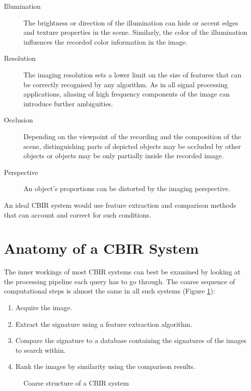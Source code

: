 \begin{description}
    \item[Illumination] The brightness or direction of the illumination can
        hide or accent edges and texture properties in the scene. Similarly,
        the color of the illumination influences the recorded color information
        in the image.
    \item[Resolution] The imaging resolution sets a lower limit on the size of
        features that can be correctly recognised by any algorithm. As in all
        signal processing applications, aliasing of high frequency components
        of the image can introduce further ambiguities.
        \autocite{shannon_communication_1998}
    \item[Occlusion] Depending on the viewpoint of the recording and the
        composition of the scene, distinguishing parts of depicted objects may
        be occluded by other objects or objects may be only partially inside
        the recorded image.
    \item[Perspective] An object's proportions can be distorted by the imaging
        perspective.
\end{description}

An ideal CBIR system would use feature extraction and comparison methods that
can account and correct for such conditions.

\section{Anatomy of a CBIR System}
The inner workings of most CBIR systems can best be examined by looking at the processing pipeline each query has to go through. The coarse sequence of computational steps is almost the same in all such systems (Figure \ref{fig:cbir_coarse_structure}):

\begin{enumerate}
    \item Acquire the image.
    \item Extract the signature using a feature extraction algorithm.
    \item Compare the signature to a database containing the signatures of the images to search within.
    \item Rank the images by similarity using the comparison results.
\end{enumerate}

\begin{figure}[h]
    \centering
    \quad
    \caption{Coarse structure of a CBIR system}
    \label{fig:cbir_coarse_structure}
\end{figure}

